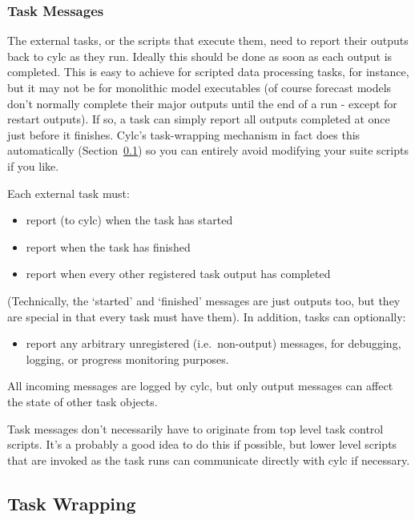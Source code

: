 \documentclass[11pt,a4paper]{article}
\begin{document}
\subsubsection{Task Messages}

The external tasks, or the scripts that execute them, need to report
their outputs back to cylc as they run. Ideally this should be done as
soon as each output is completed. This is easy to achieve for scripted
data processing tasks, for instance, but it may not be for monolithic
model executables (of course forecast models don't normally complete
their major outputs until the end of a run - except for restart
outputs). If so, a task can simply report all outputs completed at once
just before it finishes.  Cylc's task-wrapping mechanism in fact does
this automatically (Section~\ref{TaskWrapping}) so you can entirely
avoid modifying your suite scripts if you like.

Each external task must:

\begin{itemize}
\item report (to cylc) when the task has started
\item report when the task has finished
\item report when every other registered task output has
completed
\end{itemize}

(Technically, the `started' and `finished' messages are just
outputs too, but they are special in that every task
must have them). In addition, tasks can optionally:

\begin{itemize}
\item report any arbitrary unregistered (i.e.\ non-output)
messages, for debugging, logging, or progress monitoring purposes.
\end{itemize}

All incoming messages are logged by cylc, but only output messages can
affect the state of other task objects.

Task messages don't necessarily have to originate from top level task
control scripts. It's a probably a good idea to do this if possible, but
lower level scripts that are invoked as the task runs can communicate
directly with cylc if necessary.

\subsection{Task Wrapping}
\label{TaskWrapping}
\end{document}
